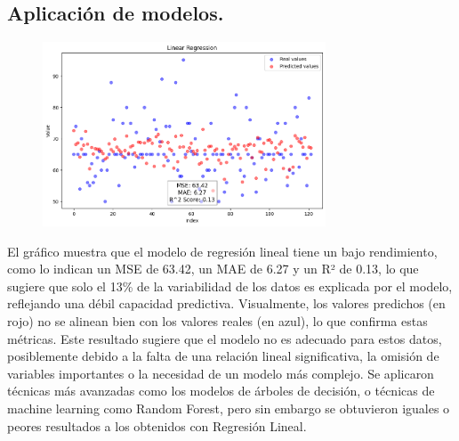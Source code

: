 \documentclass[a4paper,12pt]{article}
\begin{document}
\subsection{Aplicación de modelos.}

\begin{figure}[H]
  \centering
  \includegraphics[width=0.75\textwidth]{output5.png}
\end{figure}

El gráfico muestra que el modelo de regresión lineal tiene un bajo rendimiento, como lo indican un MSE de 63.42, un MAE de 6.27 y un R² de 0.13, lo que sugiere que solo el 13\% de la variabilidad de los datos es explicada por el modelo, reflejando una débil capacidad predictiva. Visualmente, los valores predichos (en rojo) no se alinean bien con los valores reales (en azul), lo que confirma estas métricas. Este resultado sugiere que el modelo no es adecuado para estos datos, posiblemente debido a la falta de una relación lineal significativa, la omisión de variables importantes o la necesidad de un modelo más complejo. Se aplicaron técnicas más avanzadas como los modelos de árboles de decisión, o técnicas de machine learning como Random Forest, pero sin embargo se obtuvieron iguales o peores resultados a los obtenidos con Regresión Lineal.
\end{document}

